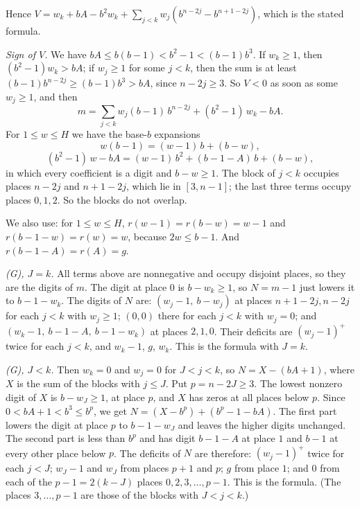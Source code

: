 \documentclass[11pt,letterpaper]{article}
\theoremstyle{paperstyle}
\theoremstyle{paperstyledef}
\theoremstyle{paperstylerem}
\begin{document}
Hence \(V = w_k + bA - b^2 w_k + \sum_{j<k} w_j (b^{n-2j} - b^{n+1-2j})\), which is the stated formula.

\emph{Sign of \(V\).} We have \(bA \leq b(b-1) < b^2 - 1 < (b-1) b^3\). If \(w_k \geq 1\), then \((b^2 - 1) w_k > bA\); if \(w_j \geq 1\) for some \(j < k\), then the sum is at least \((b-1) b^{n-2j} \geq (b-1) b^3 > bA\), since \(n - 2j \geq 3\). So \(V < 0\) as soon as some \(w_j \geq 1\), and then \[m = \sum_{j<k} w_j (b-1)\, b^{n-2j} + (b^2-1)\, w_k - bA.\] For \(1 \leq w \leq H\) we have the base-\(b\) expansions \[w(b-1) = (w-1)\,b + (b-w),\] \[(b^2-1)\,w - bA = (w-1)\,b^2 + (b-1-A)\,b + (b-w),\] in which every coefficient is a digit and \(b - w \geq 1\). The block of \(j < k\) occupies places \(n - 2j\) and \(n + 1 - 2j\), which lie in \([3, n-1]\); the last three terms occupy places \(0, 1, 2\). So the blocks do not overlap.

We also use: for \(1 \leq w \leq H\), \(r(w-1) = r(b-w) = w-1\) and \(r(b-1-w) = r(w) = w\), because \(2w \leq b - 1\). And \(r(b-1-A) = r(A) = g\).

\emph{(G), \(J = k\).} All terms above are nonnegative and occupy disjoint places, so they are the digits of \(m\). The digit at place \(0\) is \(b - w_k \geq 1\), so \(N = m - 1\) just lowers it to \(b - 1 - w_k\). The digits of \(N\) are: \((w_j - 1,\ b - w_j)\) at places \(n+1-2j, n-2j\) for each \(j < k\) with \(w_j \geq 1\); \((0, 0)\) there for each \(j < k\) with \(w_j = 0\); and \((w_k - 1,\ b-1-A,\ b-1-w_k)\) at places \(2, 1, 0\). Their deficits are \((w_j - 1)^+\) twice for each \(j < k\), and \(w_k - 1\), \(g\), \(w_k\). This is the formula with \(J = k\).

\emph{(G), \(J < k\).} Then \(w_k = 0\) and \(w_j = 0\) for \(J < j < k\), so \(N = X - (bA + 1)\), where \(X\) is the sum of the blocks with \(j \leq J\). Put \(p = n - 2J \geq 3\). The lowest nonzero digit of \(X\) is \(b - w_J \geq 1\), at place \(p\), and \(X\) has zeros at all places below \(p\). Since \(0 < bA + 1 < b^3 \leq b^p\), we get \(N = (X - b^p) + (b^p - 1 - bA)\). The first part lowers the digit at place \(p\) to \(b - 1 - w_J\) and leaves the higher digits unchanged. The second part is less than \(b^p\) and has digit \(b - 1 - A\) at place \(1\) and \(b - 1\) at every other place below \(p\). The deficits of \(N\) are therefore: \((w_j - 1)^+\) twice for each \(j < J\); \(w_J - 1\) and \(w_J\) from places \(p + 1\) and \(p\); \(g\) from place \(1\); and \(0\) from each of the \(p - 1 = 2(k - J)\) places \(0, 2, 3, \dots, p-1\). This is the formula. (The places \(3, \dots, p-1\) are those of the blocks with \(J < j < k\).)
\end{document}
